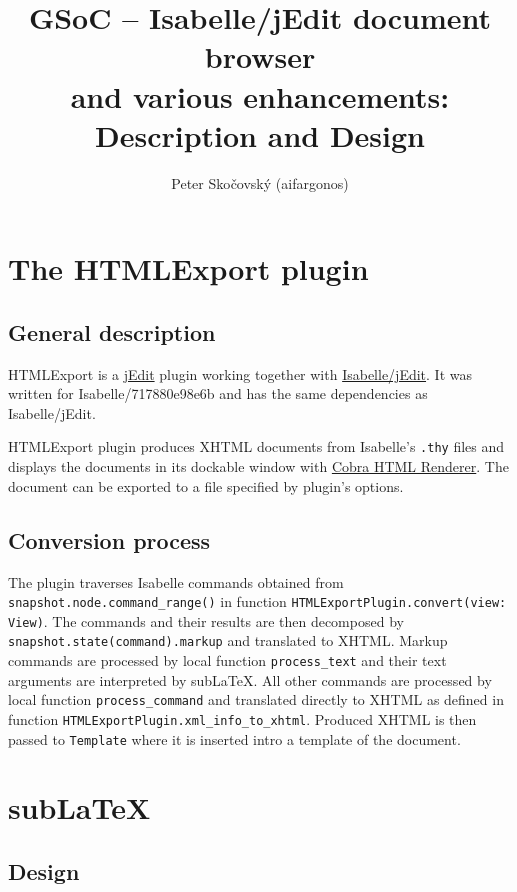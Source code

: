 \documentclass{article}
\title{GSoC -- Isabelle/jEdit document browser\\and various enhancements:\\Description and Design}
\author{Peter Skočovský (aifargonos)}
\date{}
\begin{document}
\maketitle



\section{The HTMLExport plugin}


\subsection{General description}

HTMLExport is a \href{http://www.jedit.org/}{jEdit} plugin working together
with \href{http://isabelle.in.tum.de/}{Isabelle/jEdit}. It was written for Isabelle/717880e98e6b
and has the same dependencies as Isabelle/jEdit.

HTMLExport plugin produces XHTML documents from Isabelle's \texttt{.thy} files
and displays the documents in its dockable window with \href{http://lobobrowser.org/cobra.jsp}{Cobra HTML Renderer}.
The document can be exported to a file specified by plugin's options.


\subsection{Conversion process}

The plugin traverses Isabelle commands obtained from \verb+snapshot.node.command_range()+
in function \verb+HTMLExportPlugin.convert(view: View)+.
The commands and their results are then decomposed by \verb+snapshot.state(command).markup+
and translated to XHTML. Markup commands are processed by local function \verb+process_text+
and their text arguments are interpreted by sub\LaTeX.
All other commands are processed by local function \verb+process_command+
and translated directly to XHTML as defined in function \verb+HTMLExportPlugin.xml_info_to_xhtml+.
Produced XHTML is then passed to \verb+Template+ where it is inserted intro a template of the document.



\section{sub\LaTeX}


\subsection{Design}
\end{document}
